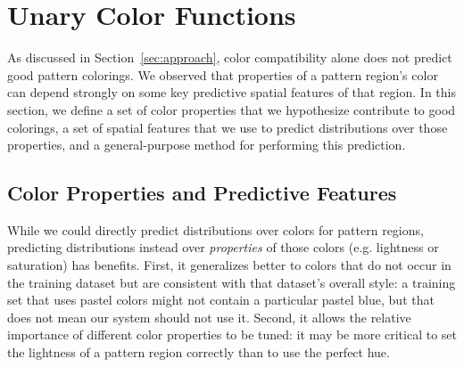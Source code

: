 \section{Unary Color Functions}
\label{sec:unary}

As discussed in Section~\ref{sec:approach}, color compatibility alone does not predict good pattern colorings. We observed that properties of a pattern region's color can depend strongly on some key predictive spatial features of that region. In this section, we define a set of color properties that we hypothesize contribute to good colorings, a set of spatial features that we use to predict distributions over those properties, and a general-purpose method for performing this prediction.

\subsection{Color Properties and Predictive Features}
\label{sec:unaryPropsAndFeatures}

While we could directly predict distributions over colors for pattern regions, predicting distributions instead over \emph{properties} of those colors (e.g. lightness or saturation) has benefits. First, it generalizes better to colors that do not occur in the training dataset but are consistent with that dataset's overall style: a training set that uses pastel colors might not contain a particular pastel blue, but that does not mean our system should not use it. Second, it allows the relative importance of different color properties to be tuned: it may be more critical to set the lightness of a pattern region correctly than to use the perfect hue.

